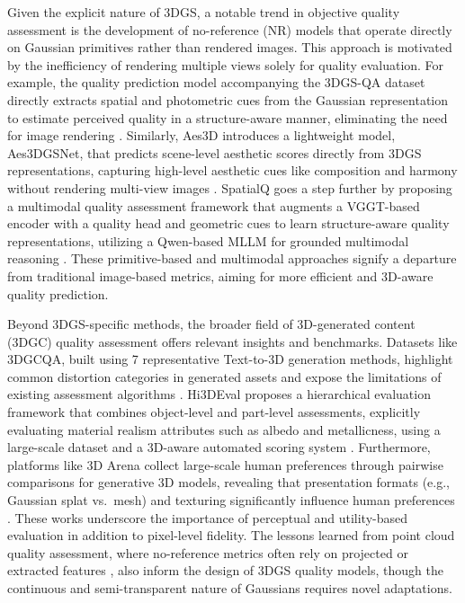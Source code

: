 \documentclass[11pt]{article}
\begin{document}
Given the explicit nature of 3DGS, a notable trend in objective quality assessment is the development of no-reference (NR) models that operate directly on Gaussian primitives rather than rendered images. This approach is motivated by the inefficiency of rendering multiple views solely for quality evaluation. For example, the quality prediction model accompanying the 3DGS-QA dataset directly extracts spatial and photometric cues from the Gaussian representation to estimate perceived quality in a structure-aware manner, eliminating the need for image rendering \cite{ref735}. Similarly, Aes3D introduces a lightweight model, Aes3DGSNet, that predicts scene-level aesthetic scores directly from 3DGS representations, capturing high-level aesthetic cues like composition and harmony without rendering multi-view images \cite{ref739}. SpatialQ goes a step further by proposing a multimodal quality assessment framework that augments a VGGT-based encoder with a quality head and geometric cues to learn structure-aware quality representations, utilizing a Qwen-based MLLM for grounded multimodal reasoning \cite{ref740}. These primitive-based and multimodal approaches signify a departure from traditional image-based metrics, aiming for more efficient and 3D-aware quality prediction.

Beyond 3DGS-specific methods, the broader field of 3D-generated content (3DGC) quality assessment offers relevant insights and benchmarks. Datasets like 3DGCQA, built using 7 representative Text-to-3D generation methods, highlight common distortion categories in generated assets and expose the limitations of existing assessment algorithms \cite{ref741}. Hi3DEval proposes a hierarchical evaluation framework that combines object-level and part-level assessments, explicitly evaluating material realism attributes such as albedo and metallicness, using a large-scale dataset and a 3D-aware automated scoring system \cite{ref742}. Furthermore, platforms like 3D Arena collect large-scale human preferences through pairwise comparisons for generative 3D models, revealing that presentation formats (e.g., Gaussian splat vs.~mesh) and texturing significantly influence human preferences \cite{ref743}. These works underscore the importance of perceptual and utility-based evaluation in addition to pixel-level fidelity. The lessons learned from point cloud quality assessment, where no-reference metrics often rely on projected or extracted features \cite{ref744,ref745}, also inform the design of 3DGS quality models, though the continuous and semi-transparent nature of Gaussians requires novel adaptations.
\end{document}
